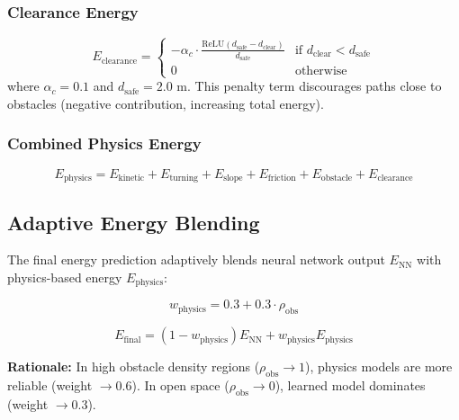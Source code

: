 \subsubsection{Clearance Energy}
\begin{equation}
E_{\text{clearance}} = \begin{cases}
-\alpha_c \cdot \frac{\text{ReLU}(d_{\text{safe}} - d_{\text{clear}})}{d_{\text{safe}}} & \text{if } d_{\text{clear}} < d_{\text{safe}} \\
0 & \text{otherwise}
\end{cases}
\label{eq:clearance_energy}
\end{equation}
where $\alpha_c = 0.1$ and $d_{\text{safe}} = 2.0$ m. This penalty term discourages paths close to obstacles (negative contribution, increasing total energy).

\subsubsection{Combined Physics Energy}
\begin{equation}
E_{\text{physics}} = E_{\text{kinetic}} + E_{\text{turning}} + E_{\text{slope}} + E_{\text{friction}} + E_{\text{obstacle}} + E_{\text{clearance}}
\label{eq:total_physics_energy}
\end{equation}

\subsection{Adaptive Energy Blending}

The final energy prediction adaptively blends neural network output $E_{\text{NN}}$ with physics-based energy $E_{\text{physics}}$:

\begin{equation}
w_{\text{physics}} = 0.3 + 0.3 \cdot \rho_{\text{obs}}
\label{eq:blend_weight}
\end{equation}

\begin{equation}
E_{\text{final}} = (1 - w_{\text{physics}}) E_{\text{NN}} + w_{\text{physics}} E_{\text{physics}}
\label{eq:energy_blending}
\end{equation}

\textbf{Rationale:} In high obstacle density regions ($\rho_{\text{obs}} \rightarrow 1$), physics models are more reliable (weight $\rightarrow 0.6$). In open space ($\rho_{\text{obs}} \rightarrow 0$), learned model dominates (weight $\rightarrow 0.3$).

